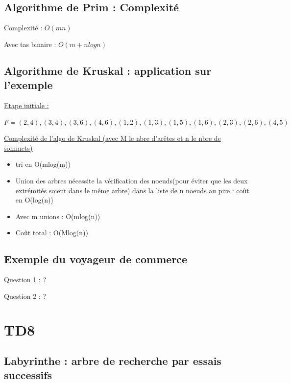 \subsection{Algorithme de Prim : Complexité}
Complexité : $O(mn)$

Avec tas binaire : $O(m+nlogn)$

\subsection{Algorithme de Kruskal : application sur l'exemple}
\underline{Etape initiale :}

$F={(2,4),(3,4),(3,6),(4,6),(1,2),(1,3),(1,5),(1,6),(2,3),(2,6),(4,5)}$

\underline{Complexité de l'algo de Kruskal (avec M le nbre d'arêtes et n le nbre de sommets)}
\begin{itemize}
\item tri en O(mlog(m))
\item Union des arbres nécessite la vérification des noeuds(pour éviter que les deux extrémités soient dans le même arbre) 
dans la liste de n noeuds au pire : coût en O(log(n))
\item Avec m unions : O(mlog(n))
\item Coût total : O(Mlog(n))
\end{itemize}

\subsection{Exemple du voyageur de commerce}
Question 1 : ?

Question 2 : ?

\section{TD8}

\subsection{Labyrinthe : arbre de recherche par essais successifs}

	
